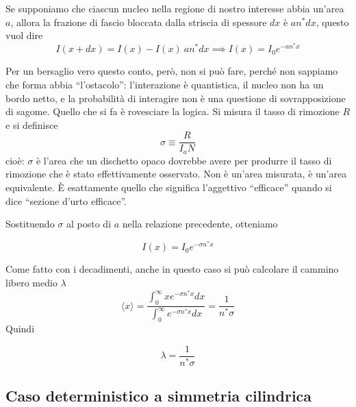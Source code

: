 Se supponiamo che ciascun nucleo nella regione di nostro interesse abbia un'area $a$, allora la frazione di fascio bloccata dalla striscia di spessore $dx$ è $a n^* dx$, questo vuol dire 
\begin{equation}
    I(x + dx) = I(x) - I(x) \ a n^* dx \implies I(x) = I_0 e^{- an^* x}
\end{equation}

Per un bersaglio vero questo conto, però, non si può fare, perché non sappiamo che forma abbia “l’ostacolo”: l’interazione è quantistica, il nucleo non ha un bordo netto, e la probabilità di interagire non è una questione di sovrapposizione di sagome. Quello che si fa è rovesciare la logica. Si misura il tasso di rimozione $R$ e si definisce
\begin{equation}
    \sigma \equiv \frac{R}{I_a N}
\end{equation}
cioè: $\sigma$ è l’area che un dischetto opaco dovrebbe avere per produrre il tasso di rimozione che è stato effettivamente osservato. Non è un’area misurata, è un’area equivalente. È esattamente quello che significa l’aggettivo “efficace” quando si dice “sezione d’urto efficace”.

Sostituendo $\sigma$ al posto di $a$ nella relazione precedente, otteniamo 
\begin{tcolorbox}[colback=black!5!white, colframe=black!45!white, boxrule=0.8pt]
\begin{equation}
    I(x) = I_0 e^{- \sigma n^* x}
\end{equation}
\end{tcolorbox}

Come fatto con i decadimenti, anche in questo caso si può calcolare il cammino libero medio $\lambda$
\begin{equation}
    \langle x \rangle = \frac{\int_0^{\infty} x e^{-\sigma n^* x} dx}{\int_0^{\infty} e^{-\sigma n^* x} dx} = \frac{1}{n^* \sigma}
\end{equation} 
Quindi
\begin{tcolorbox}[colback=black!5!white, colframe=black!45!white, boxrule=0.8pt]
\begin{equation}
    \lambda = \frac{1}{n^* \sigma}
\end{equation}
\end{tcolorbox}

\subsection{Caso deterministico a simmetria cilindrica}


